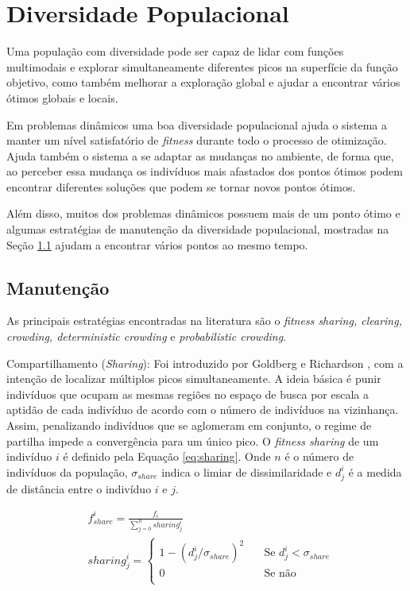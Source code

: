\section{Diversidade Populacional}
\label{sec:population_diversity}

Uma população com diversidade pode ser capaz de lidar com funções multimodais e explorar simultaneamente diferentes picos na superfície da função objetivo, como também melhorar a exploração global e ajudar a encontrar vários ótimos globais e locais.

Em problemas dinâmicos uma boa diversidade populacional ajuda o sistema a manter um nível satisfatório de \textit{fitness} durante todo o processo de otimização. Ajuda também o sistema a se adaptar as mudanças no ambiente, de forma que, ao perceber essa mudança os indivíduos mais afastados dos pontos ótimos podem encontrar diferentes soluções que podem se tornar novos pontos ótimos.

Além disso, muitos dos problemas dinâmicos possuem mais de um ponto ótimo e algumas estratégias de manutenção da diversidade populacional, mostradas na Seção \ref{sec:maintain_diversity} ajudam a encontrar vários pontos ao mesmo tempo.

\subsection{Manutenção}
\label{sec:maintain_diversity}
As principais estratégias encontradas na literatura são o \textit{fitness sharing, clearing, crowding, deterministic crowding} e \textit{probabilistic crowding}.

Compartilhamento (\textit{Sharing}): Foi introduzido por Goldberg e Richardson \cite{sharing}, com a intenção de localizar múltiplos picos simultaneamente. A ideia básica é punir indivíduos que ocupam as mesmas regiões no espaço de busca por escala a aptidão de cada indivíduo de acordo com o número de indivíduos na vizinhança. Assim, penalizando indivíduos que se aglomeram em conjunto, o regime de partilha impede a convergência para um único pico. O \textit{fitness sharing} de um indivíduo $i$ é definido pela Equação \ref{eq:sharing}. Onde $n$ é o número de indivíduos da população, $\sigma_{share}$ indica o limiar de dissimilaridade e $d_j^i$ é a medida de distância entre o indivíduo $i$ e $j$.

\begin{equation}
\label{eq:sharing}
\begin{split}
& f_{share}^i = \frac{f_i}{\sum_{j=0}^{n} sharing_j^i} \\
& sharing_j^i =
	\begin{cases}
	1 - (d_j^i/\sigma_{share})^2 	& \quad \text{Se } d_j^i < \sigma_{share}\\
	0 							& \quad \text{Se não}\\
	\end{cases}
\end{split}
\end{equation}

